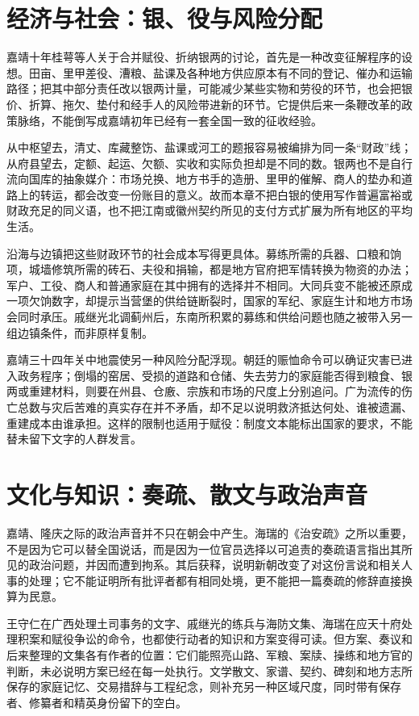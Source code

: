 \section{经济与社会：银、役与风险分配}

嘉靖十年桂萼等人关于合并赋役、折纳银两的讨论，首先是一种改变征解程序的设想。田亩、里甲差役、漕粮、盐课及各种地方供应原本有不同的登记、催办和运输路径；把其中部分责任改以银两计量，可能减少某些实物和劳役的环节，也会把银价、折算、拖欠、垫付和经手人的风险带进新的环节。它提供后来一条鞭改革的政策脉络，不能倒写成嘉靖初年已经有一套全国一致的征收经验。

从中枢望去，清丈、库藏整饬、盐课或河工的题报容易被编排为同一条“财政”线；从府县望去，定额、起运、欠额、实收和实际负担却是不同的数。银两也不是自行流向国库的抽象媒介：市场兑换、地方书手的造册、里甲的催解、商人的垫办和道路上的转运，都会改变一份账目的意义。故而本章不把白银的使用写作普遍富裕或财政充足的同义语，也不把江南或徽州契约所见的支付方式扩展为所有地区的平均生活。

沿海与边镇把这些财政环节的社会成本写得更具体。募练所需的兵器、口粮和饷项，城墙修筑所需的砖石、夫役和捐输，都是地方官府把军情转换为物资的办法；军户、工役、商人和普通家庭在其中拥有的选择并不相同。大同兵变不能被还原成一项欠饷数字，却提示当营堡的供给链断裂时，国家的军纪、家庭生计和地方市场会同时承压。戚继光北调蓟州后，东南所积累的募练和供给问题也随之被带入另一组边镇条件，而非原样复制。

嘉靖三十四年关中地震使另一种风险分配浮现。朝廷的赈恤命令可以确证灾害已进入政务程序；倒塌的窑居、受损的道路和仓储、失去劳力的家庭能否得到粮食、银两或重建材料，则要在州县、仓廒、宗族和市场的尺度上分别追问。广为流传的伤亡总数与灾后苦难的真实存在并不矛盾，却不足以说明救济抵达何处、谁被遗漏、重建成本由谁承担。这样的限制也适用于赋役：制度文本能标出国家的要求，不能替未留下文字的人群发言。

\section{文化与知识：奏疏、散文与政治声音}

嘉靖、隆庆之际的政治声音并不只在朝会中产生。海瑞的《治安疏》之所以重要，不是因为它可以替全国说话，而是因为一位官员选择以可追责的奏疏语言指出其所见的政治问题，并因而遭到拘系。其后获释，说明新朝改变了对这份言说和相关人事的处理；它不能证明所有批评者都有相同处境，更不能把一篇奏疏的修辞直接换算为民意。

王守仁在广西处理土司事务的文字、戚继光的练兵与海防文集、海瑞在应天十府处理积案和赋役争讼的命令，也都使行动者的知识和方案变得可读。但方案、奏议和后来整理的文集各有作者的位置：它们能照亮山路、军粮、案牍、操练和地方官的判断，未必说明方案已经在每一处执行。文学散文、家谱、契约、碑刻和地方志所保存的家庭记忆、交易措辞与工程纪念，则补充另一种区域尺度，同时带有保存者、修纂者和精英身份留下的空白。

